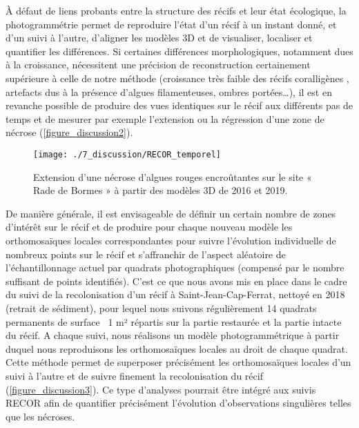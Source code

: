 À défaut de liens probants entre la structure des récifs et leur état écologique, la photogrammétrie permet de reproduire l’état d’un récif à un instant donné, et d’un suivi à l’autre, d’aligner les modèles 3D et de visualiser, localiser et quantifier les différences. Si certaines différences morphologiques, notamment dues à la croissance, nécessitent une précision de reconstruction certainement supérieure à celle de notre méthode (croissance très faible des récifs coralligènes \citep{sartoretto_age_1996}, artefacts dus à la présence d’algues filamenteuses, ombres portées…), il est en revanche possible de produire des vues identiques sur le récif aux différents pas de temps et de mesurer par exemple l’extension ou la régression d’une zone de nécrose (\autoref{figure_discussion2}).

\begin{figure}[H]
	\begin{center}
	\texttt{[image: ./7\_discussion/RECOR\_temporel]}
		\caption{Extension d’une nécrose d’algues rouges encroûtantes sur le site « Rade de Bormes » à partir des modèles 3D de 2016 et 2019.}
	\label{figure_discussion2}
\end{center}
\end{figure}

De manière générale, il est envisageable de définir un certain nombre de zones d’intérêt sur le récif et de produire pour chaque nouveau modèle les orthomosaïques locales correspondantes pour suivre l’évolution individuelle de nombreux points sur le récif et s’affranchir de l’aspect aléatoire de l’échantillonnage actuel par quadrats photographiques (compensé par le nombre suffisant de points identifiés). C’est ce que nous avons mis en place dans le cadre du suivi de la recolonisation d’un récif à Saint-Jean-Cap-Ferrat, nettoyé en 2018 (retrait de sédiment), pour lequel nous suivons régulièrement 14 quadrats permanents de surface ~1 m² répartis sur la partie restaurée et la partie intacte du récif. A chaque suivi, nous réalisons un modèle photogrammétrique à partir duquel nous reproduisons les orthomosaïques locales au droit de chaque quadrat. Cette méthode permet de superposer précisément les orthomosaïques locales d’un suivi à l’autre et de suivre finement la recolonisation du récif (\autoref{figure_discussion3}). Ce type d’analyses pourrait être intégré aux suivis RECOR afin de quantifier précisément l’évolution d’observations singulières telles que les nécroses.

